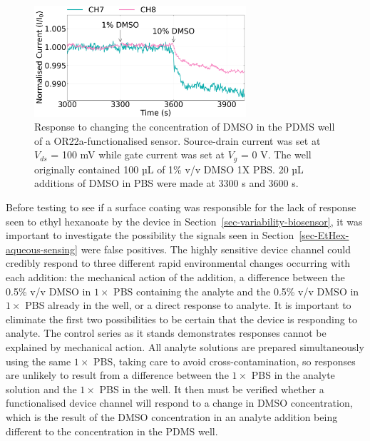 \documentclass[
  a4paper,
]{scrbook}
\begin{document}
\begin{figure}

{\centering \includegraphics[width=0.7\textwidth,height=\textheight]{figures/ch8/NGW4_D7_OR22aliposome_sampling_220623_detrend_trunc_arrows_normalised.png}

}

\caption{\label{fig-DMSO-concentration}Response to changing the
concentration of DMSO in the PDMS well of a OR22a-functionalised sensor.
Source-drain current was set at \(V_{ds}\) = 100 mV while gate current
was set at \(V_g\) = 0 V. The well originally contained 100 µL of 1\%
v/v DMSO 1X PBS. 20 µL additions of DMSO in PBS were made at 3300 s and
3600 s.}

\end{figure}

Before testing to see if a surface coating was responsible for the lack
of response seen to ethyl hexanoate by the device in
Section~\ref{sec-variability-biosensor}, it was important to investigate
the possibility the signals seen in
Section~\ref{sec-EtHex-aqueous-sensing} were false positives. The highly
sensitive device channel could credibly respond to three different rapid
environmental changes occurring with each addition: the mechanical
action of the addition, a difference between the 0.5\% v/v DMSO in
\(1 \times\) PBS containing the analyte and the 0.5\% v/v DMSO in
\(1 \times\) PBS already in the well, or a direct response to analyte.
It is important to eliminate the first two possibilities to be certain
that the device is responding to analyte. The control series as it
stands demonstrates responses cannot be explained by mechanical action.
All analyte solutions are prepared simultaneously using the same
\(1 \times\) PBS, taking care to avoid cross-contamination, so responses
are unlikely to result from a difference between the \(1 \times\) PBS in
the analyte solution and the \(1 \times\) PBS in the well. It then must
be verified whether a functionalised device channel will respond to a
change in DMSO concentration, which is the result of the DMSO
concentration in an analyte addition being different to the
concentration in the PDMS well.
\end{document}
